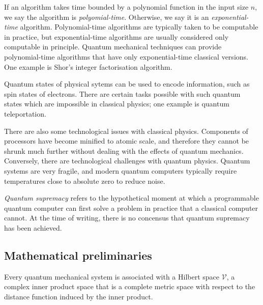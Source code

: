 If an algorithm takes time bounded by a polynomial function in the input size \( n \), we say the algorithm is \emph{polyomial-time}.
Otherwise, we say it is an \emph{exponential-time} algorithm.
Polynomial-time algorithms are typically taken to be computable in practice, but exponential-time algorithms are usually considered only computable in principle.
Quantum mechanical techniques can provide polynomial-time algorithms that have only exponential-time classical versions.
One example is Shor's integer factorisation algorithm.

Quantum states of physical sytems can be used to encode information, such as spin states of electrons.
There are certain tasks possible with such quantum states which are impossible in classical physics; one example is quantum teleportation.

There are also some technological issues with classical physics.
Components of processors have become minified to atomic scale, and therefore they cannot be shrunk much further without dealing with the effects of quantum mechanics.
Conversely, there are technological challenges with quantum physics.
Quantum systems are very fragile, and modern quantum computers typically require temperatures close to absolute zero to reduce noise.

\emph{Quantum supremacy} refers to the hypothetical moment at which a programmable quantum computer can first solve a problem in practice that a classical computer cannot.
At the time of writing, there is no concensus that quantum supremacy has been achieved.

\subsection{Mathematical preliminaries}
Every quantum mechanical system is associated with a Hilbert space \( \mathcal V \), a complex inner product space that is a complete metric space with respect to the distance function induced by the inner product.

